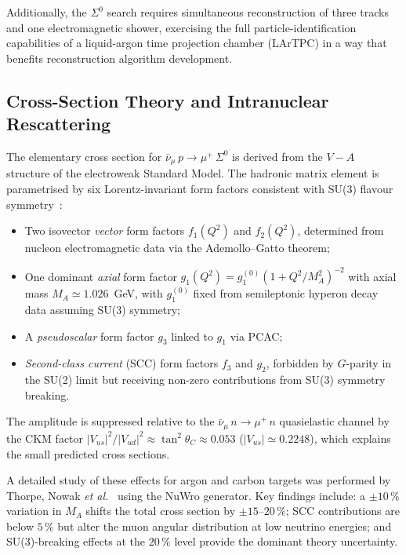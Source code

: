 \documentclass[12pt,a4paper]{article}
\begin{document}
Additionally, the $\Sigma^0$ search requires simultaneous reconstruction
of three tracks and one electromagnetic shower, exercising the full
particle-identification capabilities of a liquid-argon time projection
chamber (LArTPC) in a way that benefits reconstruction algorithm
development.

\subsection{Cross-Section Theory and Intranuclear Rescattering}
\label{sec:theory}

The elementary cross section for $\bar\nu_\mu\,p\to\mu^+\,\Sigma^0$ is
derived from the $V{-}A$ structure of the electroweak Standard Model.
The hadronic matrix element is parametrised by six Lorentz-invariant
form factors consistent with SU(3) flavour
symmetry~\cite{Thorpe:2020sbx,Alam:2014jza}:
\begin{itemize}
  \item Two isovector \emph{vector} form factors $f_1(Q^2)$ and $f_2(Q^2)$,
        determined from nucleon electromagnetic data via the
        Ademollo--Gatto theorem;
  \item One dominant \emph{axial} form factor
        $g_1(Q^2)=g_1^{(0)}(1+Q^2/M_A^2)^{-2}$ with axial mass
        $M_A\simeq1.026$~GeV, with $g_1^{(0)}$ fixed from semileptonic
        hyperon decay data assuming SU(3) symmetry;
  \item A \emph{pseudoscalar} form factor $g_3$ linked to $g_1$ via PCAC;
  \item \emph{Second-class current} (SCC) form factors $f_3$ and $g_2$,
        forbidden by $G$-parity in the SU(2) limit but receiving
        non-zero contributions from SU(3) symmetry breaking.
\end{itemize}
The amplitude is suppressed relative to the $\bar\nu_\mu\,n\to\mu^+\,n$
quasielastic channel by the CKM factor
$|V_{us}|^2/|V_{ud}|^2\approx\tan^2\theta_C\approx 0.053$
($|V_{us}|\simeq0.2248$), which explains the small predicted cross sections.

A detailed study of these effects for argon and carbon targets was
performed by Thorpe, Nowak \emph{et al.}~\cite{Thorpe:2020sbx} using
the NuWro generator.  Key findings include: a $\pm10\,\%$ variation in
$M_A$ shifts the total cross section by $\pm15$--$20\,\%$; SCC
contributions are below $5\,\%$ but alter the muon angular distribution
at low neutrino energies; and SU(3)-breaking effects at the $20\,\%$
level provide the dominant theory uncertainty.
\end{document}
